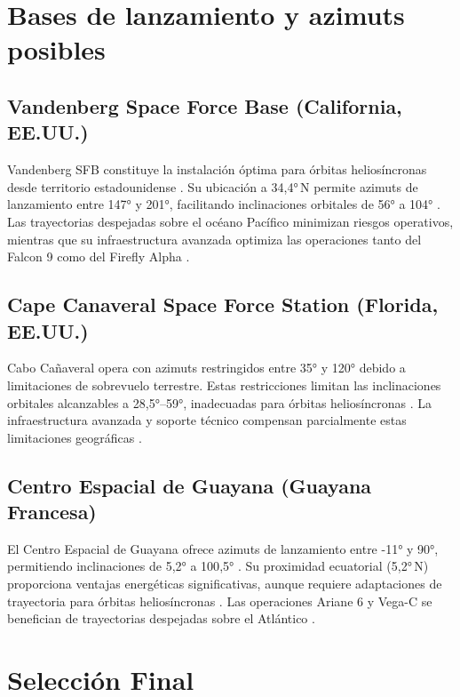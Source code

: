 \section{Bases de lanzamiento y azimuts posibles}

\subsection{Vandenberg Space Force Base (California, EE.UU.)}

Vandenberg SFB constituye la instalación óptima para órbitas heliosíncronas desde territorio estadounidense \cite{satobs2024}. Su ubicación a 34{,}4°\,N permite azimuts de lanzamiento entre 147° y 201°, facilitando inclinaciones orbitales de 56° a 104° \cite{satobs2024}. Las trayectorias despejadas sobre el océano Pacífico minimizan riesgos operativos, mientras que su infraestructura avanzada optimiza las operaciones tanto del Falcon 9 como del Firefly Alpha \cite{mdpi2024}.

\subsection{Cape Canaveral Space Force Station (Florida, EE.UU.)}

Cabo Cañaveral opera con azimuts restringidos entre 35° y 120° debido a limitaciones de sobrevuelo terrestre. Estas restricciones limitan las inclinaciones orbitales alcanzables a 28{,}5°--59°, inadecuadas para órbitas heliosíncronas \cite{satobs2024}. La infraestructura avanzada y soporte técnico compensan parcialmente estas limitaciones geográficas \cite{stackexchange2022}.

\subsection{Centro Espacial de Guayana (Guayana Francesa)}

El Centro Espacial de Guayana ofrece azimuts de lanzamiento entre -11° y 90°, permitiendo inclinaciones de 5{,}2° a 100{,}5° \cite{satobs2024}. Su proximidad ecuatorial (5{,}2°\,N) proporciona ventajas energéticas significativas, aunque requiere adaptaciones de trayectoria para órbitas heliosíncronas \cite{wikipedia2024}. Las operaciones Ariane 6 y Vega-C se benefician de trayectorias despejadas sobre el Atlántico \cite{arianespace2024}.

\section{Selección Final}

